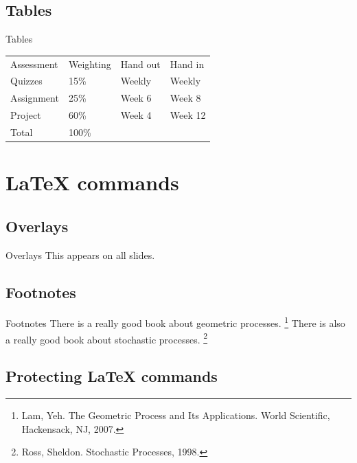 \documentclass[
  ignorenonframetext,
  aspectratio=169]{beamer}
\begin{document}
\hypertarget{tables}{%
\subsection{Tables}\label{tables}}

\begin{frame}{Tables}
\begin{longtable}[]{@{}llll@{}}
\toprule()
\endhead
Assessment & Weighting & Hand out & Hand in \\
Quizzes & 15\% & Weekly & Weekly \\
Assignment & 25\% & Week 6 & Week 8 \\
Project & 60\% & Week 4 & Week 12 \\
Total & 100\% & & \\
\bottomrule()
\end{longtable}
\end{frame}

\hypertarget{latex-commands}{%
\section{LaTeX commands}\label{latex-commands}}

\hypertarget{overlays}{%
\subsection{Overlays}\label{overlays}}

\begin{frame}{Overlays}
This appears on all slides.
\end{frame}

\hypertarget{footnotes}{%
\subsection{Footnotes}\label{footnotes}}

\begin{frame}{Footnotes}
There is a really good book about geometric processes. \footnote[frame]{
Lam, Yeh. The Geometric Process and Its Applications. World Scientific, Hackensack,
NJ, 2007.
} There is also a really good book about stochastic processes.
\footnote[frame]{
Ross, Sheldon. Stochastic Processes, 1998.
}
\end{frame}

\hypertarget{protecting-latex-commands}{%
\subsection{Protecting LaTeX commands}\label{protecting-latex-commands}}
\end{document}
